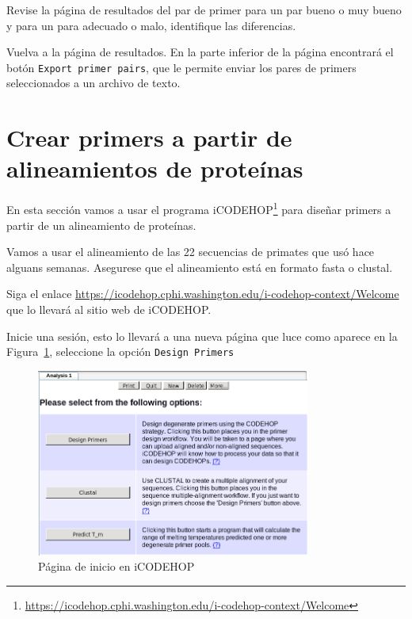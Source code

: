 \documentclass[letter,11pt]{book}
\begin{document}
Revise la página de resultados del par de primer para un par bueno o muy bueno y para un para adecuado o malo, identifique las diferencias.

Vuelva a la página de resultados. En la parte inferior de la página encontrará el botón \Verb+Export primer pairs+, que le permite enviar los pares de primers seleccionados a un archivo de texto.

\section{Crear primers a partir de alineamientos de proteínas}

En esta sección vamos a usar el programa iCODEHOP\footnote{\url{https://icodehop.cphi.washington.edu/i-codehop-context/Welcome}} para diseñar primers a partir de un alineamiento de proteínas.

Vamos a usar el alineamiento de las 22 secuencias de primates que usó hace alguans semanas. Asegurese que el alineamiento está en formato fasta o clustal.

Siga el enlace \url{https://icodehop.cphi.washington.edu/i-codehop-context/Welcome} que lo llevará al sitio web de iCODEHOP. 

Inicie una sesión, esto lo llevará a una nueva página que luce como aparece en la Figura~\ref{fig:CODEHOP_start}, seleccione la opción \Verb+Design Primers+

\begin{figure}[h!]
\centering
 \includegraphics[width=9cm]{Figs/CODEHOP_start.png}
 \caption{\label{fig:CODEHOP_start}Página de inicio en iCODEHOP}
\end{figure}
\end{document}
